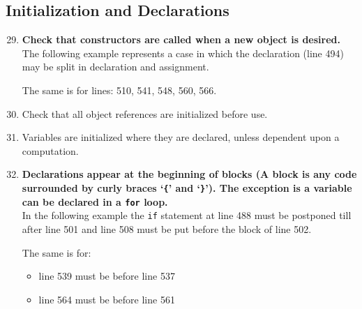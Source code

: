 \documentclass[a4paper,11pt]{report} %
\begin{document}
		\subsection*{Initialization and Declarations}\begin{enumerate}[resume]
			\setcounter{enumi}{28}
			\setcounter{enumi}{29}
			\item \textbf{Check that constructors are called when a new object is desired.}\smallskip \\
				The following example represents a case in which the declaration (line 494) may be split in declaration and assignment.
				
				The same is for lines: 510, 541, 548, 560, 566.
			\item Check that all object references are initialized before use.
			\item Variables are initialized where they are declared, unless dependent upon a computation.
			\item \textbf{Declarations appear at the beginning of blocks (A block is any code surrounded by curly braces `\texttt{\{}' and `\texttt{\}}'). The exception is a variable can be declared in a \texttt{for} loop.} \smallskip \\
				In the following example the \texttt{if} statement at line 488 must be postponed till after line 501 and line 508 must be put before the block of line 502.
				
				The same is for:
				\begin{itemize}
					\item line 539 must be before line 537
					\item line 564 must be before line 561
				\end{itemize}
		\end{enumerate}
		
\end{document}
